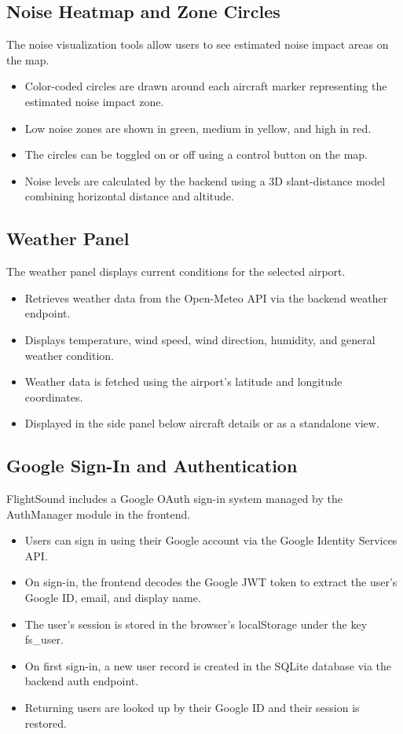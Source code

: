 \documentclass[12pt]{article}
\begin{document}
\subsection{Noise Heatmap and Zone Circles}
The noise visualization tools allow users to see estimated noise impact areas on the map.

\begin{itemize}
\item Color-coded circles are drawn around each aircraft marker representing the estimated noise impact zone.
\item Low noise zones are shown in green, medium in yellow, and high in red.
\item The circles can be toggled on or off using a control button on the map.
\item Noise levels are calculated by the backend using a 3D slant-distance model combining horizontal distance and altitude.
\end{itemize}

\subsection{Weather Panel}
The weather panel displays current conditions for the selected airport.

\begin{itemize}
\item Retrieves weather data from the Open-Meteo API via the backend weather endpoint.
\item Displays temperature, wind speed, wind direction, humidity, and general weather condition.
\item Weather data is fetched using the airport's latitude and longitude coordinates.
\item Displayed in the side panel below aircraft details or as a standalone view.
\end{itemize}

\subsection{Google Sign-In and Authentication}
FlightSound includes a Google OAuth sign-in system managed by the AuthManager module in the frontend.

\begin{itemize}
\item Users can sign in using their Google account via the Google Identity Services API.
\item On sign-in, the frontend decodes the Google JWT token to extract the user's Google ID, email, and display name.
\item The user's session is stored in the browser's localStorage under the key fs\_user.
\item On first sign-in, a new user record is created in the SQLite database via the backend auth endpoint.
\item Returning users are looked up by their Google ID and their session is restored.
\end{itemize}
\end{document}
